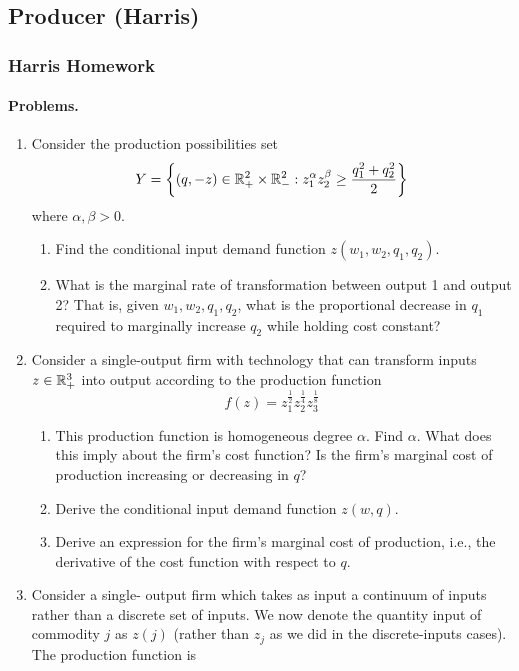 \documentclass[12pt]{article}
\begin{document}
\newpage
\subsection{Producer (Harris)}

\subsubsection{Harris Homework}

\paragraph{Problems.}

\begin{enumerate}
	\item Consider the production possibilities set
	\[
	Y = \left\{ (q,-z) \in \mathbb{R}^2_+ \times \mathbb{R}^2_- : z_1^\alpha z_2^\beta \ge \frac{q_1^2 + q_2^2}{2} \right\}
	\]
	where $\alpha,\beta > 0$.
	\begin{enumerate}
		\item Find the conditional input demand function $z(w_1,w_2,q_1,q_2)$.
		\item What is the marginal rate of transformation between output 1 and output 2? That is, given $w_1, w_2, q_1, q_2$, what is the proportional decrease in $q_1$ required to marginally increase $q_2$ while holding cost constant?
	\end{enumerate}
	\item Consider a single-output firm with technology that can transform inputs $z \in \mathbb{R}^3_+$ into output according to the production function
	\[
	f(z) = z_1^\frac{1}{2} z_2^\frac{1}{4} z_3^\frac{1}{8}
	\]
	\begin{enumerate}
		\item This production function is homogeneous degree $\alpha$. Find $\alpha$. What does this imply about the firm’s cost function? Is the firm’s marginal cost of production increasing or decreasing in $q$?
		\item Derive the conditional input demand function $z(w, q)$.
		\item Derive an expression for the firm’s marginal cost of production, i.e., the derivative of the cost function with respect to $q$.
	\end{enumerate}
	\item Consider a single- output firm which takes as input a continuum of inputs rather than a discrete set of inputs. We now denote the quantity input of commodity $j$ as $z(j)$ (rather than $z_j$ as we did in the discrete-inputs cases). The production function is

\end{enumerate}
\end{document}
